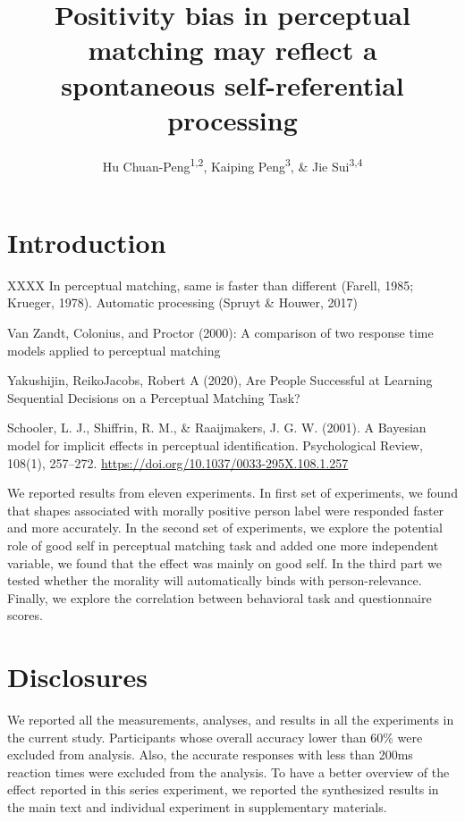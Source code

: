 \documentclass[
  english,
  man]{apa6}
\author{Hu Chuan-Peng\textsuperscript{1,2}, Kaiping Peng\textsuperscript{3}, \& Jie Sui\textsuperscript{3,4}}
\affiliation{
\vspace{0.5cm}
\textsuperscript{1} TBA\\\textsuperscript{2} Leibniz Institute for Resilience Research, 55131 Mainz, Germany\\\textsuperscript{3} Tsinghua University, 100084 Beijing, China\\\textsuperscript{4} University of Aberdeen, Aberdeen, Scotland}
\title{Positivity bias in perceptual matching may reflect a spontaneous self-referential processing}
\date{}
\begin{document}
\maketitle

\hypertarget{introduction}{%
\section{Introduction}\label{introduction}}

XXXX
In perceptual matching, same is faster than different (Farell, 1985; Krueger, 1978).
Automatic processing (Spruyt \& Houwer, 2017)

Van Zandt, Colonius, and Proctor (2000): A comparison of two response time models applied to perceptual matching

Yakushijin, ReikoJacobs, Robert A (2020), Are People Successful at Learning Sequential Decisions on a Perceptual Matching Task?

Schooler, L. J., Shiffrin, R. M., \& Raaijmakers, J. G. W. (2001). A Bayesian model for implicit effects in perceptual identification. Psychological Review, 108(1), 257--272. \url{https://doi.org/10.1037/0033-295X.108.1.257}

We reported results from eleven experiments. In first set of experiments, we found that shapes associated with morally positive person label were responded faster and more accurately. In the second set of experiments, we explore the potential role of good self in perceptual matching task and added one more independent variable, we found that the effect was mainly on good self. In the third part we tested whether the morality will automatically binds with person-relevance. Finally, we explore the correlation between behavioral task and questionnaire scores.

\hypertarget{disclosures}{%
\section{Disclosures}\label{disclosures}}

We reported all the measurements, analyses, and results in all the experiments in the current study. Participants whose overall accuracy lower than 60\% were excluded from analysis. Also, the accurate responses with less than 200ms reaction times were excluded from the analysis. To have a better overview of the effect reported in this series experiment, we reported the synthesized results in the main text and individual experiment in supplementary materials.
\end{document}
